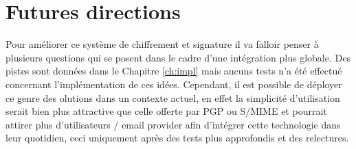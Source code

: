 \section{Futures directions}
Pour améliorer ce système de chiffrement et signature il va falloir penser à plusieurs questions qui se posent dans le cadre d'une intégration plus globale. Des pistes sont données dans le Chapitre \ref{ch:impl} mais aucuns tests n'a été effectué concernant l'implémentation de ces idées. Cependant, il est possible de déployer ce genre des olutions dans un contexte actuel, en effet la simplicité d'utilisation serait bien plus attractive que celle offerte par PGP ou S/MIME et pourrait attirer plus d'utilisateurs / email provider afin d'intégrer cette technologie dans leur quotidien, ceci uniquement après des tests plus approfondis et des relectures.
 